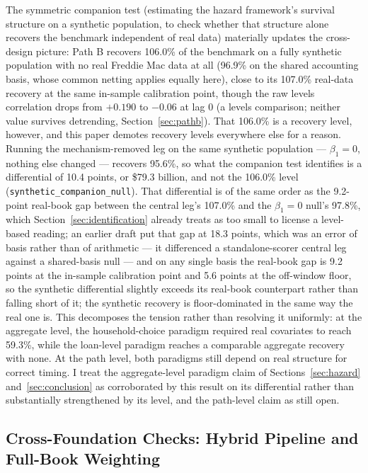 \documentclass[12pt]{article}
\begin{document}
The symmetric companion test (estimating the hazard framework's survival structure on a synthetic population, to check whether that structure alone recovers the benchmark independent of real data) materially updates the cross-design picture: Path B recovers 106.0\% of the benchmark on a fully synthetic population with no real Freddie Mac data at all (96.9\% on the shared accounting basis, whose common netting applies equally here), close to its 107.0\% real-data recovery at the same in-sample calibration point, though the raw levels correlation drops from $+0.190$ to $-0.06$ at lag 0 (a levels comparison; neither value survives detrending, Section~\ref{sec:pathb}). That 106.0\% is a recovery level, however, and this paper demotes recovery levels everywhere else for a reason. Running the mechanism-removed leg on the same synthetic population --- $\beta_1 = 0$, nothing else changed --- recovers 95.6\%, so what the companion test identifies is a differential of 10.4 points, or \$79.3 billion, and not the 106.0\% level (\texttt{synthetic\_companion\_null}). That differential is of the same order as the 9.2-point real-book gap between the central leg's 107.0\% and the $\beta_1 = 0$ null's 97.8\%, which Section~\ref{sec:identification} already treats as too small to license a level-based reading; an earlier draft put that gap at 18.3 points, which was an error of basis rather than of arithmetic --- it differenced a standalone-scorer central leg against a shared-basis null --- and on any single basis the real-book gap is 9.2 points at the in-sample calibration point and 5.6 points at the off-window floor, so the synthetic differential slightly exceeds its real-book counterpart rather than falling short of it; the synthetic recovery is floor-dominated in the same way the real one is. This decomposes the tension rather than resolving it uniformly: at the aggregate level, the household-choice paradigm required real covariates to reach 59.3\%, while the loan-level paradigm reaches a comparable aggregate recovery with none. At the path level, both paradigms still depend on real structure for correct timing. I treat the aggregate-level paradigm claim of Sections~\ref{sec:hazard} and~\ref{sec:conclusion} as corroborated by this result on its differential rather than substantially strengthened by its level, and the path-level claim as still open.

\subsection{Cross-Foundation Checks: Hybrid Pipeline and Full-Book Weighting}\label{sec:robustness-hybrid}
\end{document}
